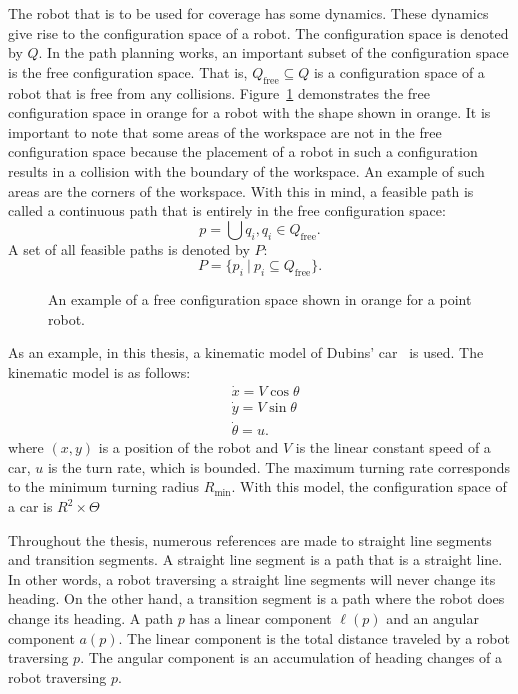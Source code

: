 \documentclass[../main.tex]{subfiles}
\begin{document}
The robot that is to be used for coverage has some dynamics. These dynamics give rise to the configuration space of a robot. The configuration space is denoted by $Q$. In the path planning works, an important subset of the configuration space is the free configuration space. That is, $Q_{\text{free}}\subseteq Q$ is a configuration space of a robot that is free from any collisions. Figure~\ref{fig:configuration_space} demonstrates the free configuration space in orange for a robot with the shape shown in orange. It is important to note that some areas of the workspace are not in the free configuration space because the placement of a robot in such a configuration results in a collision with the boundary of the workspace. An example of such areas are the corners of the workspace. With this in mind, a feasible path is called a continuous path that is entirely in the free configuration space:
\begin{equation}
	p=\bigcup q_i, q_i\in Q_{\text{free}}.
\end{equation}
A set of all feasible paths is denoted by $P$:
\begin{equation}
	P=\{p_i\ |\ p_i\subseteq Q_{\text{free}}\}.
\end{equation}

\begin{figure}
	\centering
	
	\caption{An example of a free configuration space shown in orange for a point robot.}
	\label{fig:configuration_space}
\end{figure}

As an example, in this thesis, a kinematic model of Dubins' car~\cite{dubins1957curves} is used. The kinematic model is as follows:
\begin{equation}
	\begin{aligned}
		& \dot{x}=V\cos{\theta}\\
		& \dot{y}=V\sin{\theta}\\
		& \dot{\theta}=u.
	\end{aligned}
\end{equation}
where $(x,y)$ is a position of the robot and $V$ is the linear constant speed of a car, $u$ is the turn rate, which is bounded. The maximum turning rate corresponds to the minimum turning radius $R_{\min}$. With this model, the configuration space of a car is $R^2\times\Theta$

Throughout the thesis, numerous references are made to straight line segments and transition segments. A straight line segment is a path that is a straight line. In other words, a robot traversing a straight line segments will never change its heading. On the other hand, a transition segment is a path where the robot does change its heading. A path $p$ has a linear component $\ell(p)$ and an angular component $a(p)$. The linear component is the total distance traveled by a robot traversing $p$. The angular component is an accumulation of heading changes of a robot traversing $p$.
\end{document}
